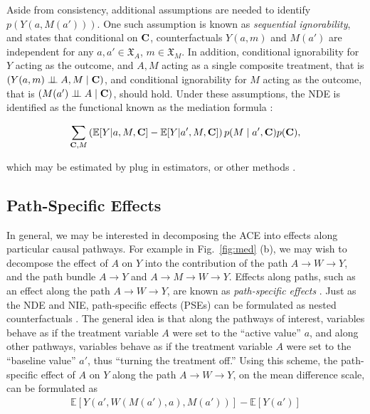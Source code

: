 \documentclass[letterpaper]{article} %
\newcommand{\citep}{\cite}
\def\ci{\perp\!\!\!\perp}
\begin{document}
Aside from consistency, additional assumptions are needed to identify $p(Y(a,M(a')))$. One such assumption is known as \emph{sequential ignorability}, and states that conditional on ${\bf C}$, counterfactuals $Y(a,m)$ and $M(a')$ are independent for any $a,a' \in {\mathfrak X}_A$, $m \in {\mathfrak X}_M$. In addition, conditional ignorability for $Y$ acting as the outcome, and $A,M$ acting as a single composite treatment, that is
  $(Y(a,m) \ci A,M \mid {\bf C})$, and conditional ignorability for $M$ acting as the outcome, that is $(M(a') \ci A \mid {\bf C})$, should hold. Under these assumptions, the NDE is identified as the functional known as the mediation formula \citep{pearl11cmf}:
\begin{small}
\begin{align}
\sum_{{\bf C},M} \left( \mathbb{E}[Y | a,M,{\bf C}] - \mathbb{E}[Y | a',M,{\bf C}] \right) p(M \mid a',{\bf C}) p({\bf C}), \label{eqn:edge-g}
\end{align}
\end{small}
which may be estimated by plug in estimators, or other methods \citep{tchetgen12semi}.


\subsection{Path-Specific Effects}
\label{subsec:path}
 
In general, we may be interested in decomposing the ACE into effects along particular causal pathways.  For example in Fig.~\ref{fig:med} (b), we may wish to decompose the effect of $A$ on $Y$ into the contribution of the path $A \to W \to Y$, and the
path bundle $A \to Y$ and $A \to M \to W \to Y$.  Effects along paths, such as an effect along the path $A \to W \to Y$, are known as \emph{path-specific effects} \citep{pearl01direct}.  Just as the NDE and NIE, path-specific effects (PSEs) can be formulated as nested counterfactuals \citep{shpitser13cogsci}. The general idea is that along the pathways of interest, variables behave as if the treatment variable $A$ were set to the ``active value'' $a$, and along other pathways, variables behave as if the treatment variable $A$ were set to the ``baseline value'' $a'$, thus ``turning the treatment off.''  Using this scheme, the path-specific effect of $A$ on $Y$ along the path $A \to W \to Y$, on the mean difference scale, can be formulated as
\begin{align}
\mathbb{E}[Y(a', W(M(a'),a), M(a'))] - \mathbb{E}[Y(a')]
\label{eqn:path-eff}
\end{align}
\end{document}
